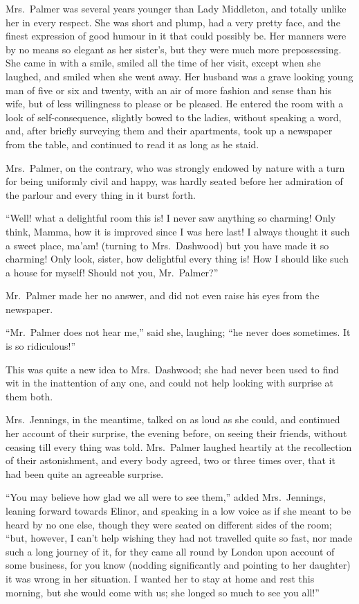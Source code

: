 Mrs.\ Palmer was several years younger than Lady
Middleton, and totally unlike her in every respect.
She was short and plump, had a very pretty face,
and the finest expression of good humour in it that could
possibly be.  Her manners were by no means so elegant
as her sister's, but they were much more prepossessing.
She came in with a smile, smiled all the time of her visit,
except when she laughed, and smiled when she went away.
Her husband was a grave looking young man of five or six
and twenty, with an air of more fashion and sense than
his wife, but of less willingness to please or be pleased.
He entered the room with a look of self-consequence,
slightly bowed to the ladies, without speaking a word,
and, after briefly surveying them and their apartments,
took up a newspaper from the table, and continued to read it
as long as he staid.

Mrs.\ Palmer, on the contrary, who was strongly endowed
by nature with a turn for being uniformly civil and happy,
was hardly seated before her admiration of the parlour
and every thing in it burst forth.

``Well! what a delightful room this is! I never
saw anything so charming!  Only think, Mamma, how it
is improved since I was here last! I always thought it
such a sweet place, ma'am! (turning to Mrs.\ Dashwood)
but you have made it so charming!  Only look, sister,
how delightful every thing is! How I should like such
a house for myself!  Should not you, Mr.\ Palmer?''

Mr.\ Palmer made her no answer, and did not even raise
his eyes from the newspaper.

``Mr.\ Palmer does not hear me,'' said she, laughing;
``he never does sometimes.  It is so ridiculous!''

This was quite a new idea to Mrs.\ Dashwood; she had
never been used to find wit in the inattention of any one,
and could not help looking with surprise at them both.

Mrs.\ Jennings, in the meantime, talked on as loud
as she could, and continued her account of their surprise,
the evening before, on seeing their friends, without
ceasing till every thing was told.  Mrs.\ Palmer laughed
heartily at the recollection of their astonishment,
and every body agreed, two or three times over, that it
had been quite an agreeable surprise.

``You may believe how glad we all were to see them,''
added Mrs.\ Jennings, leaning forward towards Elinor,
and speaking in a low voice as if she meant to be heard
by no one else, though they were seated on different sides
of the room; ``but, however, I can't help wishing they had
not travelled quite so fast, nor made such a long journey
of it, for they came all round by London upon account
of some business, for you know (nodding significantly and
pointing to her daughter) it was wrong in her situation.
I wanted her to stay at home and rest this morning,
but she would come with us; she longed so much to see
you all!''

